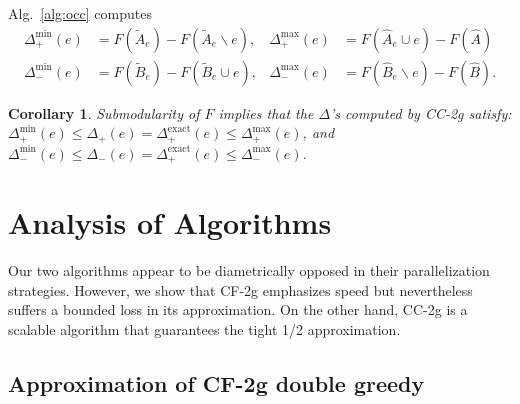 \documentclass{article} %
\newcommand{\hogwild}{CF-2g}
\newcommand{\occ}{CC-2g}
\newtheorem{cor}[thm]{Corollary}
\newcommand{\Comments}{1}
\newcommand{\note}[2]{\ifnum\Comments=1\textcolor{#1}{#2}\fi}
\newcommand{\xinghao}[1]{\note{red}{[XP: #1]}}
\newcommand{\algref}[1]{Alg.~\ref{#1}}
\begin{document}
\algref{alg:occ} computes
\begin{align*}
  \Delta_+^{\min}(e) &= F(\tilde{A}_e) - F(\tilde{A}_e \backslash e),
& \Delta_+^{\max}(e) &= F(\hat{A}_e \cup e) - F(\hat{A})\\
  \Delta_-^{\min}(e) &= F(\tilde{B}_e) - F(\tilde{B}_e \cup e),
& \Delta_-^{\max}(e) &= F(\hat{B}_e \backslash e) - F(\hat{B}).
\end{align*}

\begin{cor}\label{cor:occ:delta_bound} Submodularity of $F$ implies that the $\Delta$'s computed by \occ{} satisfy: $\Delta_+^{\min}(e) \leq \Delta_+(e) = \Delta_+^{\text{exact}}(e) \leq \Delta_+^{\max}(e)$, and $\Delta_-^{\min}(e) \leq \Delta_-(e) = \Delta_+^{\text{exact}}(e) \leq \Delta_-^{\max}(e)$.
\end{cor}
















\section{Analysis of Algorithms \label{sec:analysis}}


Our two algorithms appear to be diametrically opposed in their parallelization strategies.
However, we show that \hogwild{} emphasizes speed but nevertheless suffers a bounded loss in its approximation.
On the other hand, \occ{} is a scalable algorithm that guarantees the tight 1/2 approximation.


\subsection{Approximation of \hogwild{} double greedy \label{sec:analysis:hogwild}}
\end{document}
